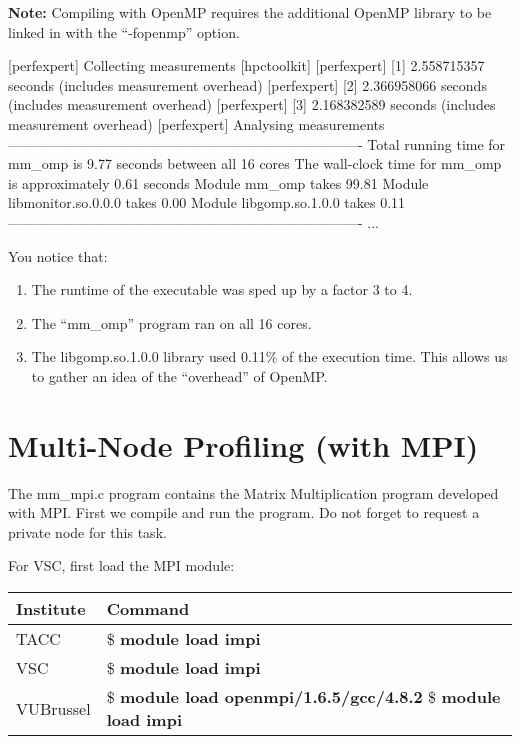 \textbf{Note:} Compiling with OpenMP requires the additional OpenMP library to be linked in with the ``-fopenmp'' option.

\begin{prompt}
[perfexpert] Collecting measurements [hpctoolkit]
[perfexpert]    [1] 2.558715357 seconds (includes measurement overhead)
[perfexpert]    [2] 2.366958066 seconds (includes measurement overhead)
[perfexpert]    [3] 2.168382589 seconds (includes measurement overhead)
[perfexpert] Analysing measurements
----------------------------------------------------------------------------
Total running time for mm_omp is 9.77 seconds between all 16 cores
The wall-clock time for mm_omp is approximately 0.61 seconds
Module mm_omp takes 99.81%
Module libmonitor.so.0.0.0 takes 0.00%
Module libgomp.so.1.0.0 takes 0.11%
----------------------------------------------------------------------------
...
\end{prompt}

You notice that:
\begin{enumerate}
  \item  The runtime of the executable was sped up by a factor 3 to 4.
  \item  The ``mm\_omp'' program ran on all 16 cores.
  \item  The libgomp.so.1.0.0 library used 0.11\% of the execution time. This allows us to gather an idea of the ``overhead'' of OpenMP.
\end{enumerate}

\section{Multi-Node Profiling (with MPI)}
\label{sec:Multi_node_profiling_MPI}

The mm\_mpi.c program contains the Matrix Multiplication program developed with MPI. First we compile and run the program. Do not forget to request a private node for this task.

For VSC, first load the MPI module:

\begin{prompt}
\end{prompt}

\begin{tabular}{|p{}|p{}} \hline
\textbf{Institute}          & \textbf{Command} \\ \hline
TACC                        & \$ \textbf{module load impi} \\ \hline
VSC                         & \$ \textbf{module load impi} \\ \hline
VUBrussel                   & \$ \textbf{module load openmpi/1.6.5/gcc/4.8.2}
                              \$ \textbf{module load impi} \\ \hline
\end{tabular}


